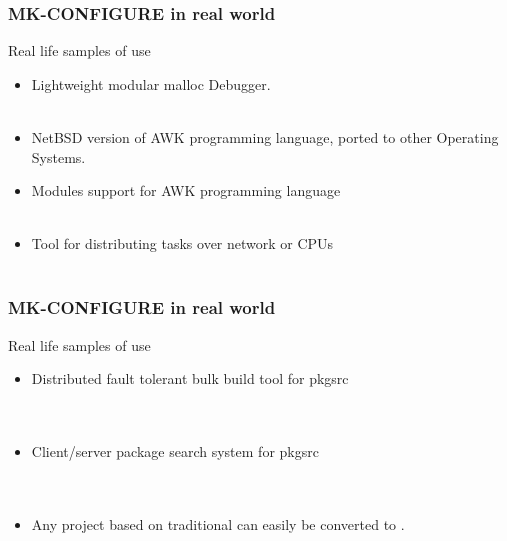 \documentclass[hyperref={colorlinks=true}]{beamer}
\begin{document}

\begin{frame}[fragile,t]
  \frametitle{MK-CONFIGURE in real world}
  \begin{block}{Real life samples of use}
  \begin{itemize}
  \item Lightweight modular malloc Debugger.\\
    \\
  \item NetBSD version of AWK programming language, ported
    to other Operating Systems.\\
  \item Modules support for AWK programming language\\
    \\
  \item Tool for distributing tasks over network or CPUs\\
    \\
  \end{itemize}
  \end{block}
\end{frame}


\begin{frame}[fragile,t]
  \frametitle{MK-CONFIGURE in real world}
  \begin{block}{Real life samples of use}
  \begin{itemize}
  \item Distributed fault tolerant bulk build tool for pkgsrc\\
    \\
    \\
  \item Client/server package search system for pkgsrc\\
    \\
    \\
  \item Any project based on traditional
     can easily be converted
    to .
  \end{itemize}
  \end{block}
\end{frame}
\end{document}
